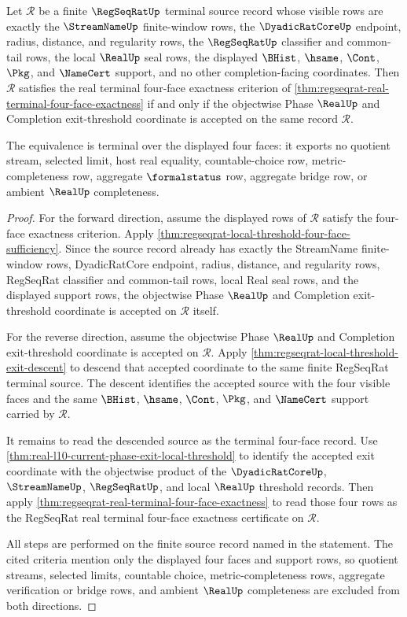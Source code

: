\begin{theorem}
\label{thm:regseqrat-four-face-exit-threshold-equivalence}
Let $\mathcal R$ be a finite $\RegSeqRatUp$ terminal source record whose visible rows are exactly the $\StreamNameUp$ finite-window rows, the $\DyadicRatCoreUp$ endpoint, radius, distance, and regularity rows, the $\RegSeqRatUp$ classifier and common-tail rows, the local $\RealUp$ seal rows, the displayed $\BHist$, $\hsame$, $\Cont$, $\Pkg$, and $\NameCert$ support, and no other completion-facing coordinates. Then $\mathcal R$ satisfies the real terminal four-face exactness criterion of \autoref{thm:regseqrat-real-terminal-four-face-exactness} if and only if the objectwise Phase $\RealUp$ and Completion exit-threshold coordinate is accepted on the same record $\mathcal R$.

The equivalence is terminal over the displayed four faces: it exports no quotient stream, selected limit, host real equality, countable-choice row, metric-completeness row, aggregate $\formalstatus$ row, aggregate bridge row, or ambient $\RealUp$ completeness.
\end{theorem}
\begin{proof}
For the forward direction, assume the displayed rows of $\mathcal R$ satisfy the four-face exactness criterion. Apply \autoref{thm:regseqrat-local-threshold-four-face-sufficiency}. Since the source record already has exactly the StreamName finite-window rows, DyadicRatCore endpoint, radius, distance, and regularity rows, RegSeqRat classifier and common-tail rows, local Real seal rows, and the displayed support rows, the objectwise Phase $\RealUp$ and Completion exit-threshold coordinate is accepted on $\mathcal R$ itself.

For the reverse direction, assume the objectwise Phase $\RealUp$ and Completion exit-threshold coordinate is accepted on $\mathcal R$. Apply \autoref{thm:regseqrat-local-threshold-exit-descent} to descend that accepted coordinate to the same finite RegSeqRat terminal source. The descent identifies the accepted source with the four visible faces and the same $\BHist$, $\hsame$, $\Cont$, $\Pkg$, and $\NameCert$ support carried by $\mathcal R$.

It remains to read the descended source as the terminal four-face record. Use \autoref{thm:real-l10-current-phase-exit-local-threshold} to identify the accepted exit coordinate with the objectwise product of the $\DyadicRatCoreUp$, $\StreamNameUp$, $\RegSeqRatUp$, and local $\RealUp$ threshold records. Then apply \autoref{thm:regseqrat-real-terminal-four-face-exactness} to read those four rows as the RegSeqRat real terminal four-face exactness certificate on $\mathcal R$.

All steps are performed on the finite source record named in the statement. The cited criteria mention only the displayed four faces and support rows, so quotient streams, selected limits, countable choice, metric-completeness rows, aggregate verification or bridge rows, and ambient $\RealUp$ completeness are excluded from both directions.
\end{proof}

